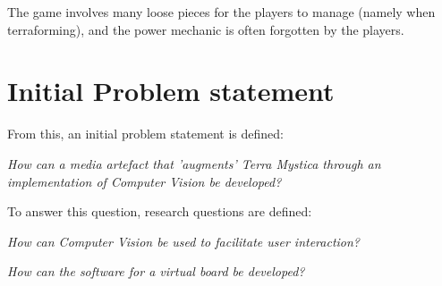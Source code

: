 The game involves many loose pieces for the players to manage (namely when terraforming), and the power mechanic is often forgotten by the players.

\section{Initial Problem statement}
From this, an initial problem statement is defined: 

\textit{How can a media artefact that 'augments' Terra Mystica through an implementation of Computer Vision be developed?}

To answer this question, research questions are defined:

\textit{How can Computer Vision be used to facilitate user interaction?}

\textit{How can the software for a virtual board be developed?}


